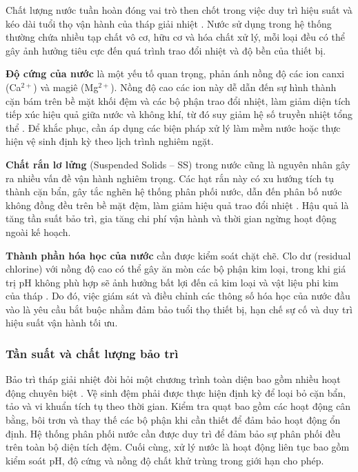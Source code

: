 \documentclass[../main.tex]{subfiles}
\begin{document}
Chất lượng nước tuần hoàn đóng vai trò then chốt trong việc duy trì hiệu suất và kéo dài tuổi thọ vận hành của tháp giải nhiệt \cite{epa_cooling_tower_guide_2017,ashrae2020cooling}. Nước sử dụng trong hệ thống thường chứa nhiều tạp chất vô cơ, hữu cơ và hóa chất xử lý, mỗi loại đều có thể gây ảnh hưởng tiêu cực đến quá trình trao đổi nhiệt và độ bền của thiết bị.

\textbf{Độ cứng của nước} là một yếu tố quan trọng, phản ánh nồng độ các ion canxi (Ca$^{2+}$) và magiê (Mg$^{2+}$). Nồng độ cao các ion này dễ dẫn đến sự hình thành cặn bám trên bề mặt khối đệm và các bộ phận trao đổi nhiệt, làm giảm diện tích tiếp xúc hiệu quả giữa nước và không khí, từ đó suy giảm hệ số truyền nhiệt tổng thể \cite{unep2006coolingtower_en}. Để khắc phục, cần áp dụng các biện pháp xử lý làm mềm nước hoặc thực hiện vệ sinh định kỳ theo lịch trình nghiêm ngặt.

\textbf{Chất rắn lơ lửng} (Suspended Solids – SS) trong nước cũng là nguyên nhân gây ra nhiều vấn đề vận hành nghiêm trọng. Các hạt rắn này có xu hướng tích tụ thành cặn bẩn, gây tắc nghẽn hệ thống phân phối nước, dẫn đến phân bố nước không đồng đều trên bề mặt đệm, làm giảm hiệu quả trao đổi nhiệt \cite{ashrae2020cooling}. Hậu quả là tăng tần suất bảo trì, gia tăng chi phí vận hành và thời gian ngừng hoạt động ngoài kế hoạch.

\textbf{Thành phần hóa học của nước} cần được kiểm soát chặt chẽ. Clo dư (residual chlorine) với nồng độ cao có thể gây ăn mòn các bộ phận kim loại, trong khi giá trị pH không phù hợp sẽ ảnh hưởng bất lợi đến cả kim loại và vật liệu phi kim của tháp \cite{epa_cooling_tower_guide_2017}. Do đó, việc giám sát và điều chỉnh các thông số hóa học của nước đầu vào là yêu cầu bắt buộc nhằm đảm bảo tuổi thọ thiết bị, hạn chế sự cố và duy trì hiệu suất vận hành tối ưu.

\subsubsection{Tần suất và chất lượng bảo trì}
Bảo trì tháp giải nhiệt đòi hỏi một chương trình toàn diện bao gồm nhiều hoạt động chuyên biệt \cite{epa_cooling_tower_guide_2017}. Vệ sinh đệm phải được thực hiện định kỳ để loại bỏ cặn bẩn, tảo và vi khuẩn tích tụ theo thời gian. Kiểm tra quạt bao gồm các hoạt động cân bằng, bôi trơn và thay thế các bộ phận khi cần thiết để đảm bảo hoạt động ổn định. Hệ thống phân phối nước cần được duy trì để đảm bảo sự phân phối đều trên toàn bộ diện tích đệm. Cuối cùng, xử lý nước là hoạt động liên tục bao gồm kiểm soát pH, độ cứng và nồng độ chất khử trùng trong giới hạn cho phép.
\end{document}
